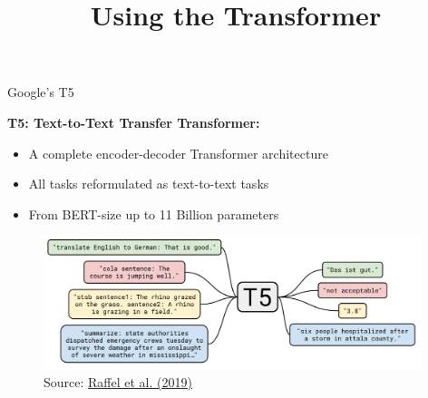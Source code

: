 



\newcommand{\titlefigure}{figure/sesamestreet.jpeg}
\newcommand{\learninggoals}{
\item Understand the improvements over BERT
\item Dynamic Masking}

\title{Using the Transformer}
\date{}




\begin{frame}{Google's T5 \href{https://arxiv.org/pdf/1910.10683.pdf}{}}

	\textbf{T5: Text-to-Text Transfer Transformer:}

	\begin{itemize}
		\item A complete encoder-decoder Transformer architecture
		\item All tasks reformulated as text-to-text tasks
		\item From BERT-size up to 11 Billion parameters
	\end{itemize}
	
	\begin{figure}
		\centering
		\includegraphics[width = 11cm]{figure/t5.png}\\ 
		\footnotesize{Source:} \href{https://arxiv.org/pdf/1910.10683.pdf}{\footnotesize Raffel et al. (2019)}
	\end{figure}
\end{frame}


